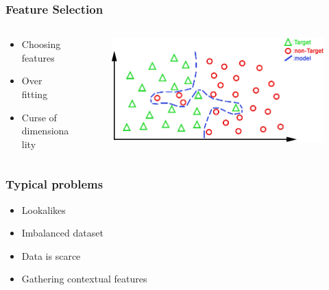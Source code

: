 \documentclass{beamer}
\begin{document}
\begin{frame}
\frametitle{Feature Selection}

	\begin{columns}[T]
    \begin{column}{.5\textwidth}

	\begin{itemize}
		\item Choosing features
		\item Over fitting 
		\item Curse of dimensionality
	\end{itemize}
	
	\end{column}	
	\begin{column}{.5\textwidth}
	
	\begin{figure}
		\includegraphics[width=\textwidth]{./img/overfit2.png}
	\end{figure}

	\end{column}	
	\end{columns}
	
\end{frame}


\begin{frame}
\frametitle{Typical problems}

	\begin{itemize}
		\item Lookalikes
		\item Imbalanced dataset
		\item Data is scarce
		\item Gathering contextual features
	\end{itemize}
	
\end{frame}
\end{document}
